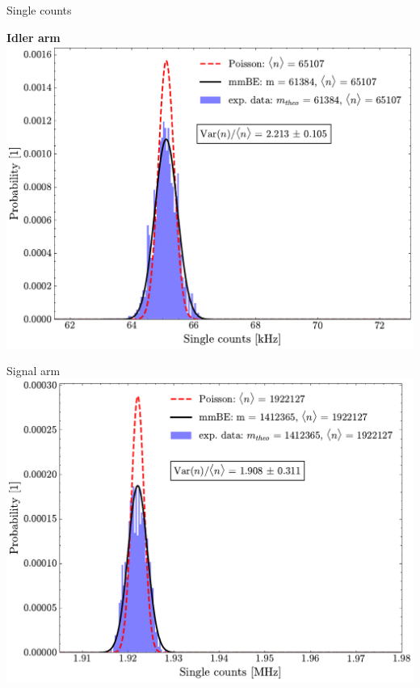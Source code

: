 \documentclass[10pt,aspectratio=43]{beamer}
\begin{document}
	\begin{frame}{Single counts}
		\begin{minipage}{.5\textwidth}
			\centering
			\textbf{Idler arm}
			\vspace{2em}
			\includegraphics[width=\textwidth]{Images/SingleStatisticsIdler.pdf}
		\end{minipage}
		\hfill
		\begin{minipage}{.5\textwidth}
			\centering
			Signal arm
			\vspace{2em}
			\includegraphics[width=\textwidth]{Images/SingleStatisticsSignal.pdf}
		\end{minipage}
	\end{frame}
	
\end{document}
